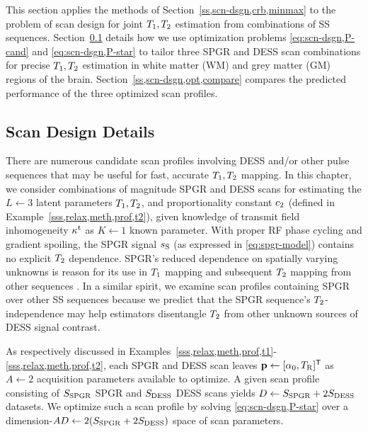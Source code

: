 This section applies the methods 
of Section~\ref{ss,scn-dsgn,crb,minmax} 
to the problem of scan design 
for joint $T_1,T_2$ estimation 
from combinations of SS sequences. 
Section~\ref{ss,scn-dsgn,opt,design} details 
how we use optimization problems
\eqref{eq:scn-dsgn,P-cand} and \eqref{eq:scn-dsgn,P-star} 
to tailor three SPGR and DESS scan combinations
for precise $T_1,T_2$ estimation 
in white matter (WM) and grey matter (GM) regions 
of the brain. 
Section~\ref{ss,scn-dsgn,opt,compare} compares the predicted performance 
of the three optimized scan profiles.

\subsection{Scan Design Details}
\label{ss,scn-dsgn,opt,design}

There are numerous candidate scan profiles
involving DESS and/or other pulse sequences
that may be useful
for fast, accurate $T_1,T_2$ mapping.
In this chapter,
we consider combinations
of magnitude SPGR and DESS scans
for estimating the $L\gets3$ latent parameters
$T_1,T_2$, and proportionality constant $c_{2}$
(defined in Example~\ref{sss,relax,meth,prof,t2}),
given knowledge 
of transmit field inhomogeneity $\kappa^{\mathrm{t}}$
as $K \gets 1$ known parameter.
With proper RF phase cycling
and gradient spoiling,
the SPGR signal $s_{\mathrm{S}}$
(as expressed in \eqref{eq:spgr-model})
contains no explicit $T_2$ dependence.
SPGR's reduced dependence
on spatially varying unknowns
is reason for its use in $T_1$ mapping
\cite{fram:87:rco, chang:08:lls, wang:12:srt}
and subsequent $T_2$ mapping
from other sequences
\cite{deoni:03:rct, nataraj:14:mbe}.
In a similar spirit, 
we examine scan profiles containing SPGR 
over other SS sequences because we predict 
that the SPGR sequence's $T_2$-independence 
may help estimators disentangle $T_2$ 
from other unknown sources of DESS signal contrast.

As respectively discussed
in Examples~\ref{sss,relax,meth,prof,t1}-\ref{sss,relax,meth,prof,t2},
each SPGR and DESS scan leaves 
$\mathbf{p} \gets [\alpha_0, T_\mathrm{R}]^{\mathsf{T}}$
as $A \gets 2$ acquisition parameters
available to optimize.
A given scan profile consisting 
of $S_{\mathrm{SPGR}}$ SPGR and $S_{\mathrm{DESS}}$ DESS scans 
yields $D \gets S_{\mathrm{SPGR}} + 2S_{\mathrm{DESS}}$ datasets. 
We optimize such a scan profile 
by solving \eqref{eq:scn-dsgn,P-star} 
over a dimension-$AD \gets 2(S_{\mathrm{SPGR}} + 2S_{\mathrm{DESS}})$ space 
of scan parameters.

